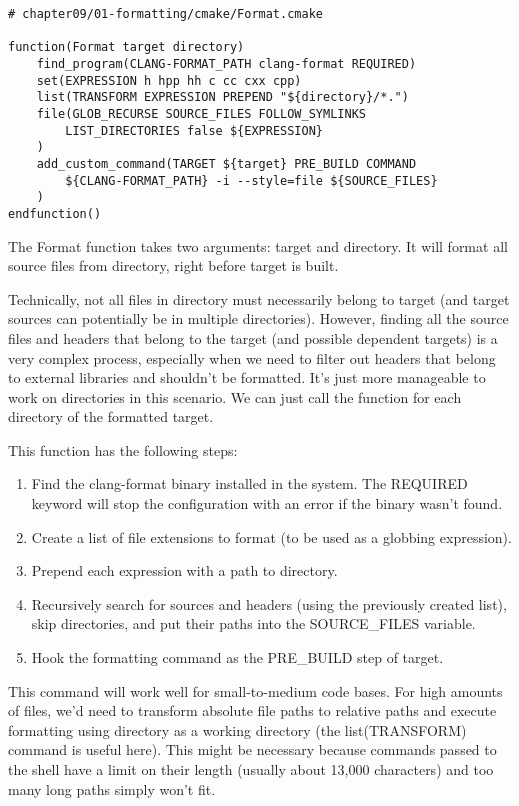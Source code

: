 \begin{lstlisting}[style=styleCMake]
# chapter09/01-formatting/cmake/Format.cmake

function(Format target directory)
	find_program(CLANG-FORMAT_PATH clang-format REQUIRED)
	set(EXPRESSION h hpp hh c cc cxx cpp)
	list(TRANSFORM EXPRESSION PREPEND "${directory}/*.")
	file(GLOB_RECURSE SOURCE_FILES FOLLOW_SYMLINKS
		LIST_DIRECTORIES false ${EXPRESSION}
	)
	add_custom_command(TARGET ${target} PRE_BUILD COMMAND
		${CLANG-FORMAT_PATH} -i --style=file ${SOURCE_FILES}
	)
endfunction()
\end{lstlisting}

The Format function takes two arguments: target and directory. It will format all source files from directory, right before target is built.

Technically, not all files in directory must necessarily belong to target (and target sources can potentially be in multiple directories). However, finding all the source files and headers that belong to the target (and possible dependent targets) is a very complex process, especially when we need to filter out headers that belong to external libraries and shouldn't be formatted. It's just more manageable to work on directories in this scenario. We can just call the function for each directory of the formatted target.

This function has the following steps:

\begin{enumerate}
\item 
Find the clang-format binary installed in the system. The REQUIRED keyword will stop the configuration with an error if the binary wasn't found.

\item 
Create a list of file extensions to format (to be used as a globbing expression).

\item 
Prepend each expression with a path to directory.

\item 
Recursively search for sources and headers (using the previously created list), skip directories, and put their paths into the SOURCE\_FILES variable.

\item 
Hook the formatting command as the PRE\_BUILD step of target.
\end{enumerate}

This command will work well for small-to-medium code bases. For high amounts of files, we'd need to transform absolute file paths to relative paths and execute formatting using directory as a working directory (the list(TRANSFORM) command is useful here). This might be necessary because commands passed to the shell have a limit on their length (usually about 13,000 characters) and too many long paths simply won't fit.

